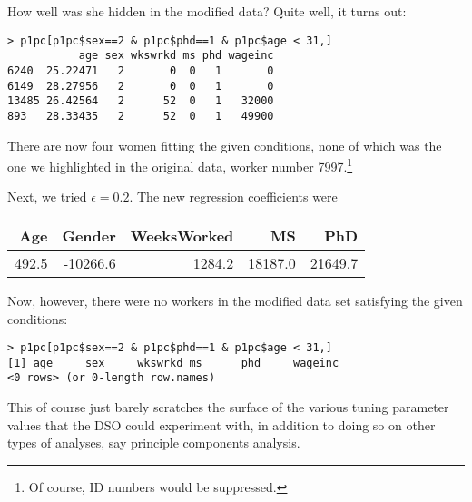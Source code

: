 \documentclass[11pt]{article}
\begin{document}
How well was she hidden in the modified data?  Quite well, it turns out:

\begin{lstlisting}
> p1pc[p1pc$sex==2 & p1pc$phd==1 & p1pc$age < 31,]
           age sex wkswrkd ms phd wageinc
6240  25.22471   2       0  0   1       0
6149  28.27956   2       0  0   1       0
13485 26.42564   2      52  0   1   32000
893   28.33435   2      52  0   1   49900
\end{lstlisting}

There are now four women fitting the given conditions, none of which was
the one we highlighted in the original data, worker number
7997.\footnote{Of course, ID numbers would be suppressed.}

Next, we tried $\epsilon = 0.2$.  The new regression coefficients were


\begin{tabular}{|r|r|r|r|r|}
\hline
Age & Gender & WeeksWorked & MS & PhD \\ \hline 
492.5 & -10266.6 & 1284.2 & 18187.0 & 21649.7 \\ \hline 
\end{tabular}

Now, however, there were no workers in the modified data set satisfying
the given conditions:

\begin{lstlisting}
> p1pc[p1pc$sex==2 & p1pc$phd==1 & p1pc$age < 31,]
[1] age     sex     wkswrkd ms      phd     wageinc
<0 rows> (or 0-length row.names)
\end{lstlisting}

This of course just barely scratches the surface of the various tuning
parameter values that the DSO could experiment with, in addition to
doing so on other types of analyses, say principle components analysis.


\end{document}
